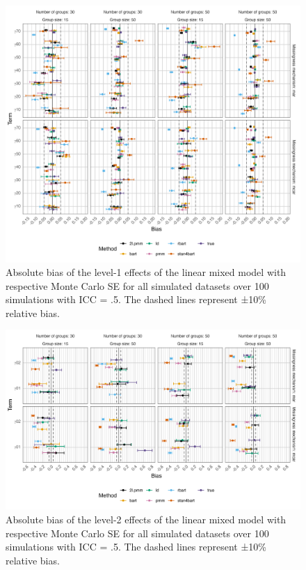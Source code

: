 \documentclass[10pt, a4paper, titlepage]{article}
\begin{document}
\begin{figure}[H]
    \centering 
    \includegraphics[width=1\textwidth]{biaslevel1.png}
    \caption{Absolute bias of the level-1 effects of the linear mixed model with respective Monte Carlo SE for all simulated datasets over 100 simulations with ICC = .5. The dashed lines represent ±10\% relative bias.}
    \label{fig:biaslevel1}
\end{figure}

\begin{figure}[H]
    \centering
    \includegraphics[width=1\textwidth]{biaslevel2.png}
    \caption{Absolute bias of the level-2 effects of the linear mixed model with respective Monte Carlo SE for all simulated datasets over 100 simulations with ICC = .5. The dashed lines represent ±10\% relative bias.}
    \label{fig:biaslevel2}
\end{figure}
\end{document}
